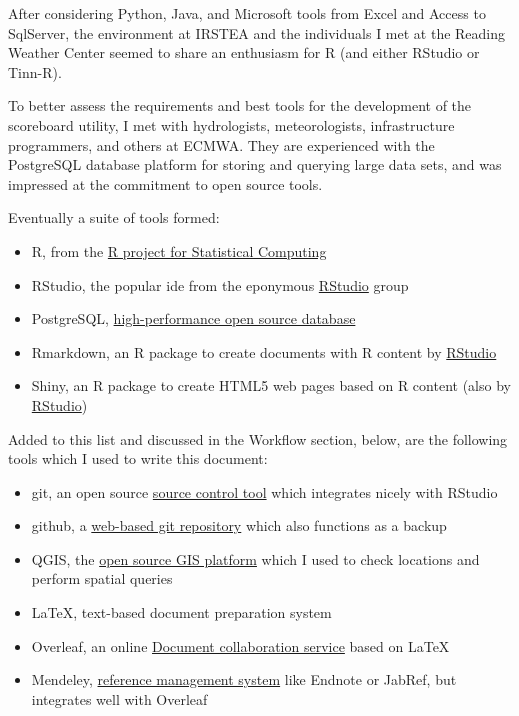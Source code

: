 \documentclass[logos,parttoc,morelanguage=french,morelanguage=german]{orsay-memoire}
\begin{document}
After considering Python, Java, and Microsoft tools from Excel and Access to SqlServer, the environment at IRSTEA and the individuals I met at the Reading Weather Center seemed to share an enthusiasm for R (and either RStudio or Tinn-R).

To better assess the requirements and best tools for the development of the scoreboard utility, I met with hydrologists, meteorologists, infrastructure programmers, and others at ECMWA. They are experienced with the PostgreSQL database platform for storing and querying large data sets, and was impressed at the commitment to open source tools.

Eventually a suite of tools formed:

\begin{itemize}
\item R, from the \href{https://www.r-project.org/}{R project for Statistical Computing}
\item RStudio, the popular \gls{ide} from the eponymous \href{https://www.rstudio.com/}{RStudio} group
\item PostgreSQL, \href{https://www.postgresql.org/}{high-performance open source database}
\item Rmarkdown, an R package to create documents with R content by \href{https://www.rstudio.com/}{RStudio}
\item Shiny, an R package to create HTML5 web pages based on R content (also by \href{https://www.rstudio.com/}{RStudio})
\end{itemize}

Added to this list and discussed in the Workflow section, below, are the following tools which I used to write this document:

\begin{itemize}
\item git, an open source \href{https://git-scm.com/}{source control tool} which integrates nicely with RStudio
\item github, a \href{https://github.com/}{web-based git repository} which also functions as a backup
\item QGIS, the \href{http://www.qgis.org/fr/site/}{open source GIS platform} which I used to check locations and perform spatial queries
\item \gls{LaTeX}, text-based document preparation system
\item Overleaf, an online \href{https://www.overleaf.com/}{Document collaboration service} based on LaTeX
\item Mendeley, \href{https://www.mendeley.com/}{reference management system} like Endnote or JabRef, but integrates well with Overleaf
\end{itemize}
\end{document}
